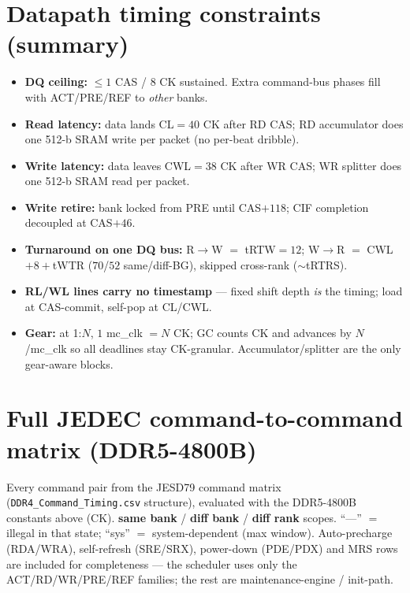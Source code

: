 \documentclass[10pt]{article}
\begin{document}
\section{Datapath timing constraints (summary)}
\begin{itemize}[leftmargin=1.2em,itemsep=1pt]
\item \textbf{DQ ceiling:} $\le1$ CAS / 8 CK sustained. Extra command-bus phases fill with
      ACT/PRE/REF to \emph{other} banks.
\item \textbf{Read latency:} data lands CL$=40$ CK after RD CAS; RD accumulator does one 512-b
      SRAM write per packet (no per-beat dribble).
\item \textbf{Write latency:} data leaves CWL$=38$ CK after WR CAS; WR splitter does one 512-b
      SRAM read per packet.
\item \textbf{Write retire:} bank locked from PRE until CAS$+118$; CIF completion decoupled at
      CAS$+46$.
\item \textbf{Turnaround on one DQ bus:} R$\rightarrow$W $=$ tRTW$=12$; W$\rightarrow$R $=$ CWL$+8+$tWTR
      ($70$/$52$ same/diff-BG), skipped cross-rank ($\sim$tRTRS).
\item \textbf{RL/WL lines carry no timestamp} --- fixed shift depth \emph{is} the timing; load at
      CAS-commit, self-pop at CL/CWL.
\item \textbf{Gear:} at 1:$N$, $1$ mc\_clk $=N$ CK; GC counts CK and advances by $N$/mc\_clk so
      all deadlines stay CK-granular. Accumulator/splitter are the only gear-aware blocks.
\end{itemize}

\section{Full JEDEC command-to-command matrix (DDR5-4800B)}
Every command pair from the JESD79 command matrix (\texttt{DDR4\_Command\_Timing.csv} structure),
evaluated with the DDR5-4800B constants above (CK). \textbf{same bank} / \textbf{diff bank} /
\textbf{diff rank} scopes. ``—'' $=$ illegal in that state; ``sys'' $=$ system-dependent (max
window). Auto-precharge (RDA/WRA), self-refresh (SRE/SRX), power-down (PDE/PDX) and MRS rows are
included for completeness --- the scheduler uses only the ACT/RD/WR/PRE/REF families; the rest are
maintenance-engine / init-path.

\end{document}
